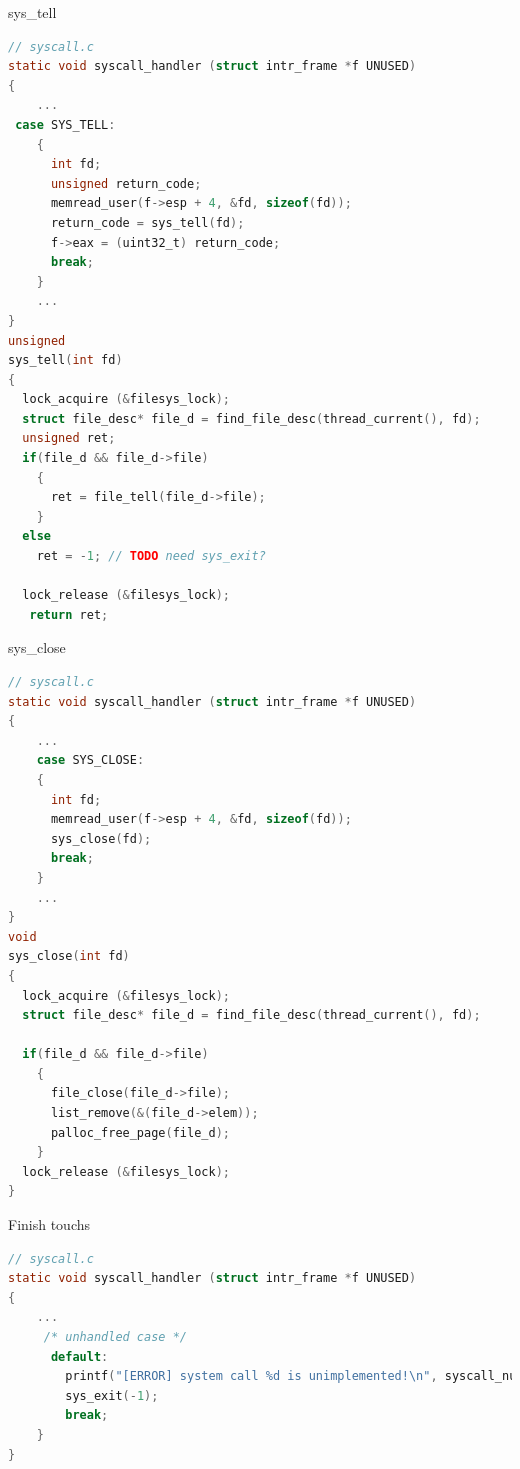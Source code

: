 \documentclass[10pt]{beamer}
\begin{document}
\begin{frame}[fragile]{sys\_tell}
    \begin{lstlisting}[language=C]
// syscall.c
static void syscall_handler (struct intr_frame *f UNUSED) 
{
    ...
 case SYS_TELL:
    {
      int fd;
      unsigned return_code;
      memread_user(f->esp + 4, &fd, sizeof(fd));
      return_code = sys_tell(fd);
      f->eax = (uint32_t) return_code;
      break;
    }
    ...
}
unsigned 
sys_tell(int fd) 
{
  lock_acquire (&filesys_lock);
  struct file_desc* file_d = find_file_desc(thread_current(), fd);
  unsigned ret;
  if(file_d && file_d->file) 
    {
      ret = file_tell(file_d->file);
    }
  else
    ret = -1; // TODO need sys_exit?

  lock_release (&filesys_lock);
   return ret;
    \end{lstlisting}
\end{frame}
\begin{frame}[fragile]{sys\_close}
    \begin{lstlisting}[language=C]
// syscall.c
static void syscall_handler (struct intr_frame *f UNUSED) 
{
    ...
    case SYS_CLOSE:
    {
      int fd;
      memread_user(f->esp + 4, &fd, sizeof(fd));
      sys_close(fd);
      break;
    }
    ...
}
void 
sys_close(int fd) 
{
  lock_acquire (&filesys_lock);
  struct file_desc* file_d = find_file_desc(thread_current(), fd);

  if(file_d && file_d->file) 
    {
      file_close(file_d->file);
      list_remove(&(file_d->elem));
      palloc_free_page(file_d);
    }
  lock_release (&filesys_lock);
}
    \end{lstlisting}
\end{frame}
\begin{frame}[fragile]{Finish touchs}
    \begin{lstlisting}[language=C]
// syscall.c
static void syscall_handler (struct intr_frame *f UNUSED) 
{
    ...
     /* unhandled case */
      default:
        printf("[ERROR] system call %d is unimplemented!\n", syscall_number);
        sys_exit(-1);
        break;
    }
}
    \end{lstlisting}
\end{frame}
\end{document}
